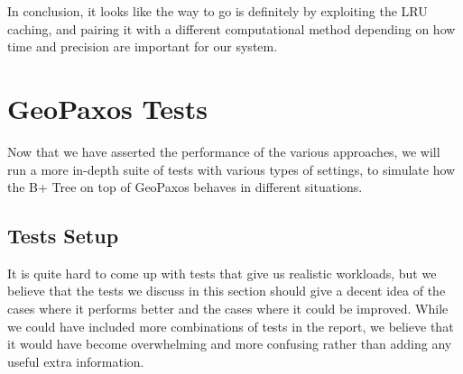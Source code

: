 In conclusion, it looks like the way to go is definitely by exploiting the LRU caching, and pairing it with a different computational method depending on how time and precision are important for our system.

\clearpage
\section{GeoPaxos Tests}\label{sec:geopaxos-tests}
Now that we have asserted the performance of the various approaches, we will run a more in-depth suite of tests with various types of settings, to simulate how the B+ Tree on top of GeoPaxos behaves in different situations.
\subsection{Tests Setup}\label{sec:tests-setup}
It is quite hard to come up with tests that give us realistic workloads, but we believe that the tests we discuss in this section should give a decent idea of the cases where it performs better and the cases where it could be improved. While we could have included more combinations of tests in the report, we believe that it would have become overwhelming and more confusing rather than adding any useful extra information.

